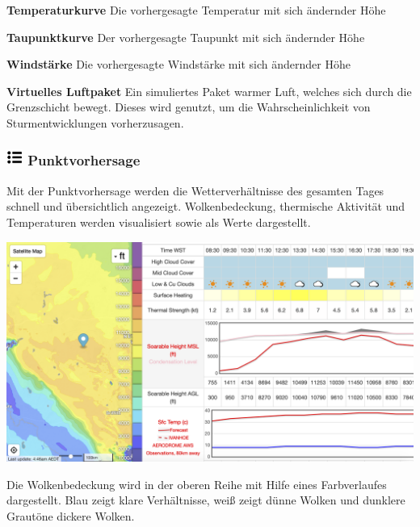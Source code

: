 \documentclass[9pt,a4paper,twocolumn]{article}
\begin{document}
\begin{arrow_red}
\item \textbf{Temperaturkurve} Die vorhergesagte Temperatur mit sich ändernder Höhe 
\end{arrow_red}
\begin{arrow_green}
\item \textbf{Taupunktkurve} Der vorhergesagte Taupunkt mit sich ändernder Höhe
\end{arrow_green}
\begin{arrow_blue}
\item \textbf{Windstärke} Die vorhergesagte Windstärke mit sich ändernder Höhe 
\end{arrow_blue}
\begin{arrow_pink}
\item \textbf{Virtuelles Luftpaket} Ein simuliertes Paket warmer Luft, welches sich durch die Grenzschicht bewegt. Dieses wird genutzt, um die Wahrscheinlichkeit von Sturmentwicklungen vorherzusagen. 
\end{arrow_pink}
\subsubsection*{\includegraphics[height=15pt]{images/icons/point_forecast.png} Punktvorhersage}

Mit der Punktvorhersage werden die Wetterverhältnisse des gesamten Tages schnell und übersichtlich angezeigt. Wolkenbedeckung, thermische Aktivität und Temperaturen werden visualisiert sowie als Werte dargestellt.



\includegraphics[width=\linewidth]{images/point_forecast.png}

Die Wolkenbedeckung wird in der oberen Reihe mit Hilfe eines Farbverlaufes dargestellt. Blau zeigt klare Verhältnisse, weiß zeigt dünne Wolken und dunklere Grautöne dickere Wolken.
\end{document}
